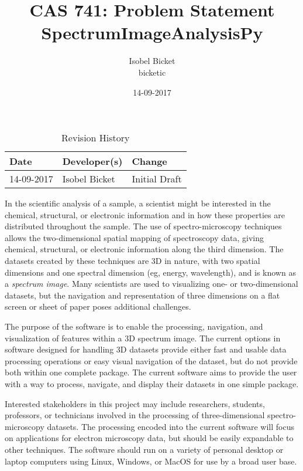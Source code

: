 \documentclass{article}
\title{CAS 741: Problem Statement\\SpectrumImageAnalysisPy}
\author{Isobel Bicket\\bicketic}
\date{14-09-2017}
\begin{document}
\maketitle

\begin{table}[hp]
\caption{Revision History} \label{TblRevisionHistory}
\begin{tabularx}{\textwidth}{llX}
\toprule
\textbf{Date} & \textbf{Developer(s)} & \textbf{Change}\\
\midrule
14-09-2017 & Isobel Bicket & Initial Draft\\

\bottomrule
\end{tabularx}
\end{table}

In the scientific analysis of a sample, a scientist might be interested in the chemical, structural, or electronic information and in how these properties are distributed throughout the sample. The use of spectro-microscopy techniques allows the two-dimensional spatial mapping of spectroscopy data, giving chemical, structural, or electronic information along the third dimension. The datasets created by these techniques are 3D in nature, with two spatial dimensions and one spectral dimension (eg, energy, wavelength), and is known as a \textit{spectrum image}. Many scientists are used to visualizing one- or two-dimensional datasets, but the navigation and representation of three dimensions on a flat screen or sheet of paper poses additional challenges.

The purpose of the software is to enable the processing, navigation, and visualization of features within a 3D spectrum image. The current options in software designed for handling 3D datasets provide either fast and usable data processing operations or easy visual navigation of the dataset, but do not provide both within one complete package. The current software aims to provide the user with a way to process, navigate, and display their datasets in one simple package. 

Interested stakeholders in this project may include researchers, students, professors, or technicians involved in the processing of three-dimensional spectro-microscopy datasets. The processing encoded into the current software will focus on applications for electron microscopy data, but should be easily expandable to other techniques. The software should run on a variety of personal desktop or laptop computers using Linux, Windows, or MacOS for use by a broad user base.
\end{document}
